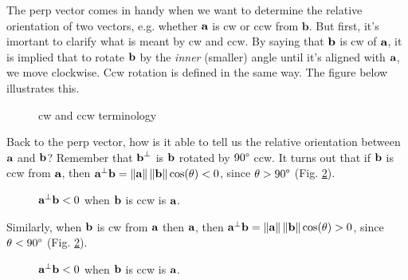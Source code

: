 \documentclass[a4paper]{article}
\begin{document}
The perp vector comes in handy when we want to determine the relative orientation of two vectors, e.g. whether $\textbf{a}$ is cw or ccw from $\textbf{b}$. But first, it's imortant to clarify what is meant by cw and ccw. By saying that $\textbf{b}$ is cw of $\textbf{a}$, it is implied that to rotate $\textbf{b}$ by the \textit{inner} (smaller) angle until it's aligned with $\textbf{a}$, we move clockwise. Ccw rotation is defined in the same way. The figure below illustrates this.

\begin{figure}[H]
    \centering
    \qquad
    \caption{cw and ccw terminology}%
    \label{fig:cw_ccw_terms}%
\end{figure}

Back to the perp vector, how is it able to tell us the relative orientation between $\textbf{a}$ and $\textbf{b}$? Remember that $\textbf{b}^{\bot}$ is $\textbf{b}$ rotated by $90\degree$ ccw. It turns out that if $\textbf{b}$
 is ccw from $\textbf{a}$, then $\textbf{a}^{\bot}\textbf{b} = \left\lVert\textbf{a}\right\rVert\left\lVert\textbf{b}\right\rVert\cos(\theta) < 0$, since $\theta > 90\degree$ (Fig. \ref{fig:b_ccw_a_sign_pdot}).
 
\begin{figure}[H]
    \centering
    \qquad
    \caption{$\textbf{a}^{\bot}\textbf{b} <0$ when $\textbf{b}$ is ccw is $\textbf{a}$.}%
    \label{fig:b_ccw_a_sign_pdot}%
\end{figure}

Similarly, when $\textbf{b}$ is cw from $\textbf{a}$ then $\textbf{a}$, then $\textbf{a}^{\bot}\textbf{b} = \left\lVert\textbf{a}\right\rVert\left\lVert\textbf{b}\right\rVert\cos(\theta) > 0$, since $\theta < 90\degree$ (Fig. \ref{fig:b_ccw_a_sign_pdot}).

\begin{figure}[H]
    \centering
    \qquad
    \caption{$\textbf{a}^{\bot}\textbf{b} <0$ when $\textbf{b}$ is ccw is $\textbf{a}$.}%
    \label{fig:b_cw_a_sign_pdot}%
\end{figure}
\end{document}
